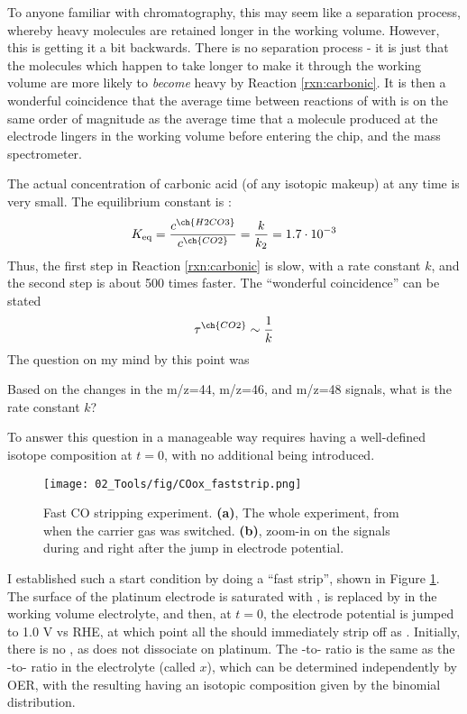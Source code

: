 To anyone familiar with chromatography, this may seem like a separation process, whereby heavy  molecules are retained longer in the working volume. However, this is getting it a bit backwards. There is no separation process - it is just that the  molecules which happen to take longer to make it through the working volume are more likely to \textit{become} heavy by Reaction \ref{rxn:carbonic}. It is then a wonderful coincidence that the average time between reactions of  with  is on the same order of magnitude as the average time that a  molecule produced at the electrode lingers in the working volume before entering the chip, and the mass spectrometer.

The actual concentration of carbonic acid (of any isotopic makeup) at any time is very small. The equilibrium constant is \cite{CRC2015}:
\begin{equation}
K_\text{eq} = \frac{c^{\ch{H2CO3}}}{c^{\ch{CO2}}} = \frac{k}{k_2} = 1.7\cdot 10^{-3}
\end{equation}
Thus, the first step in Reaction \ref{rxn:carbonic} is slow, with a rate constant $k$, and the second step is about 500 times faster. The ``wonderful coincidence'' can be stated
\begin{equation}
\tau^{\ch{CO2}}\sim\frac{1}{k}
\end{equation}
The question on my mind by this point was
\begin{question}
Based on the changes in the m/z=44, m/z=46, and m/z=48 signals, what is the rate constant $k$?
\end{question}
To answer this question in a manageable way requires having a well-defined isotope composition at $t=0$, with no additional  being introduced.
\begin{figure}[t!]
	\centering
	\texttt{[image: 02\_Tools/fig/COox\_faststrip.png]}
	\caption{Fast CO stripping experiment. \textbf{(a)}, The whole experiment, from when the carrier gas was switched. \textbf{(b)}, zoom-in on the  signals during and right after the jump in electrode potential.}
	\label{fig:COox_faststrip}
\end{figure}
I established such a start condition by doing a ``fast  strip'', shown in Figure \ref{fig:COox_faststrip}. The surface of the platinum electrode is saturated with ,  is replaced by  in the working volume electrolyte, and then, at $t=0$, the electrode potential is jumped to 1.0 V vs RHE, at which point all the  should immediately strip off as . Initially, there is no , as  does not dissociate on platinum. The -to- ratio is the same as the -to- ratio in the electrolyte (called $x$), which can be determined independently by OER, with the resulting  having an isotopic composition given by the binomial distribution.

